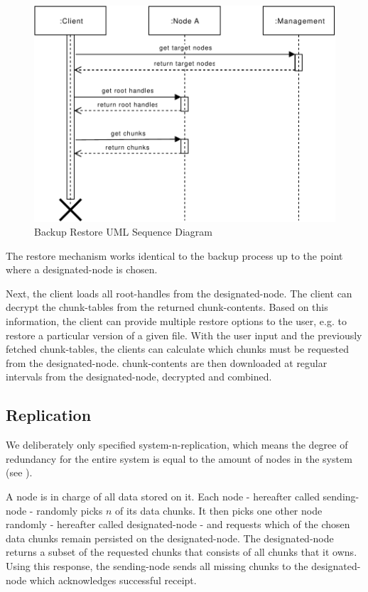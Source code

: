 \begin{figure}[h]
    \centering
    \includegraphics[width=\linewidth]{resources/backup_restore.pdf}
    \caption{Backup Restore UML Sequence Diagram}
\end{figure}

The restore mechanism works identical to the backup process up to the point where a \gls{designated-node} is chosen.

Next, the \gls{client} loads all \glspl{root-handle} from the \gls{designated-node}. The \gls{client} can decrypt the \glspl{chunk-table} from the returned \glspl{chunk-content}. Based on this information, the \gls{client} can provide multiple restore options to the \gls{user}, e.g. to restore a particular version of a given file.
With the user input and the previously fetched \glspl{chunk-table}, the \glspl{client} can calculate which \glspl{chunk} must be requested from the \gls{designated-node}. \Glspl{chunk-content} are then downloaded at regular intervals from the \gls{designated-node}, decrypted and combined.

\subsection{Replication}\label{sec:replication}
We deliberately only specified \gls{system-n-replication}, which means the degree of redundancy for the entire system is equal to the amount of \glspl{node} in the system (see ).

A \gls{node} is in charge of all data stored on it. Each \gls{node} - hereafter called \gls{sending-node} - randomly picks $n$ of its data \glspl{chunk}. It then picks one other \gls{node} randomly - hereafter called \gls{designated-node} - and requests which of the chosen data \glspl{chunk} remain persisted on the \gls{designated-node}. The \gls{designated-node} returns a subset of the requested \glspl{chunk} that consists of all \glspl{chunk} that it owns. Using this response, the \gls{sending-node} sends all missing \glspl{chunk} to the \gls{designated-node} which acknowledges successful receipt.

